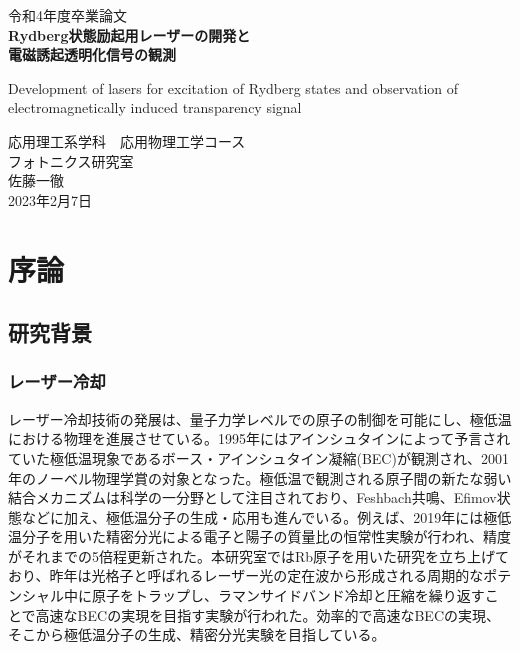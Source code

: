 \documentclass[dvipdfmx]{jsreport}
\begin{document}
\begin{titlepage}
   \begin{center}
       \vspace*{2cm}

       \huge
       令和4年度卒業論文\\
       \vspace{0.5cm}
       \textbf{Rydberg状態励起用レーザーの開発と\\電磁誘起透明化信号の観測}
       
       \vspace{0.5cm}
       \LARGE
        Development of lasers for excitation of Rydberg states and observation of electromagnetically induced transparency signal

       \large
       \vspace{2cm}
       応用理工系学科　応用物理工学コース \\
       
       \vspace{1cm}
       フォトニクス研究室 \\
       
    \vspace{1cm}
       佐藤一徹 \\
            
       \vspace{1cm}
       2023年2月7日            
   \end{center}
\end{titlepage}

\setcounter{tocdepth}{3}
\tableofcontents

\clearpage
\chapter{序論}
\section{研究背景}
\subsection{レーザー冷却}
レーザー冷却技術の発展は、量子力学レベルでの原子の制御を可能にし、極低温における物理を進展させている。1995年にはアインシュタインによって予言されていた極低温現象であるボース・アインシュタイン凝縮(BEC)が観測され、2001年のノーベル物理学賞の対象となった。\cite{bose}極低温で観測される原子間の新たな弱い結合メカニズムは科学の一分野として注目されており、Feshbach共鳴\cite{fesh}、Efimov状態\cite{efimov}などに加え、極低温分子の生成・応用も進んでいる。例えば、2019年には極低温分子を用いた精密分光による電子と陽子の質量比の恒常性実験が行われ、精度がそれまでの5倍程更新された。\cite{kobayashi}本研究室ではRb原子を用いた研究を立ち上げており、昨年は光格子と呼ばれるレーザー光の定在波から形成される周期的なポテンシャル中に原子をトラップし、ラマンサイドバンド冷却と圧縮を繰り返すことで高速なBECの実現を目指す実験が行われた。\cite{okuda}効率的で高速なBECの実現、そこから極低温分子の生成、精密分光実験を目指している。
\end{document}
